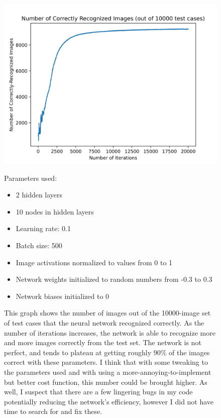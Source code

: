 \documentclass[12pt]{article}
\begin{document}
\begin{center}
    \begin{figure}[h!]
        \caption{
            This graph shows the number of images out of the 10000-image set of test cases that the neural network recognized correctly.
            As the number of iterations increases, the network is able to recognize more and more images correctly from the test set.
            The network is not perfect, and tends to plateau at getting roughly 90\% of the images correct with these parameters. 
            I think that with some tweaking to the parameters used and with using a more-annoying-to-implement but better cost function, this number could be brought higher.
            As well, I suspect that there are a few lingering bugs in my code potentially reducing the network's efficiency, however I did not have time to search for and fix these.
            \smallskip
        }
        \centering
        \includegraphics[scale=0.9]{test-2layer-10node-act0.3-2/network.png}

        Parameters used:
        \medskip
        \begin{itemize}
            \itemsep0em 
            \item 2 hidden layers
            \item 10 nodes in hidden layers
            \item Learning rate: 0.1
            \item Batch size: 500
            \item Image activations normalized to values from 0 to 1
            \item Network weights initialized to random numbers from -0.3 to 0.3
            \item Network biases initialized to 0 
        \end{itemize}
        \centering
    \end{figure}
\end{center}
\end{document}
